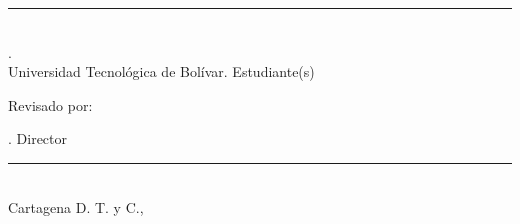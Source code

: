 {\begin{flushright}
\rule{8cm}{1pt} \\


\AUTOR .\\Universidad Tecnológica de Bolívar. Estudiante(s) \\
\vspace{2cm}

Revisado por: \\
\vspace{2cm}

\DIRECTOR . Director \\
\vspace{-2cm}
\rule{8cm}{1pt} \\

\vfill
Cartagena D. T. y C., \FECHA \\
\end{flushright}
\normalsize

}
